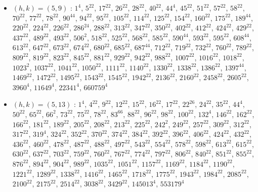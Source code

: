 \begin{itemize}
\item $(h,k)=(5,9)$ : $1^{4}$, $5^{22}$, $17^{22}$, $26^{22}$, $28^{22}$, $40^{22}$, $44^{4}$, $45^{22}$, $51^{22}$, $57^{22}$, $58^{22}$, $70^{22}$, $77^{22}$, $78^{22}$, $90^{44}$, $94^{22}$, $95^{22}$, $105^{22}$, $114^{22}$, $125^{22}$, $154^{22}$, $160^{22}$, $175^{22}$, $189^{44}$, $220^{22}$, $224^{22}$, $226^{22}$, $286^{24}$, $288^{22}$, $313^{22}$, $347^{22}$, $350^{22}$, $402^{22}$, $412^{22}$, $424^{22}$, $429^{22}$, $437^{22}$, $489^{22}$, $493^{22}$, $506^{2}$, $518^{22}$, $525^{22}$, $568^{22}$, $585^{22}$, $590^{44}$, $593^{22}$, $595^{22}$, $608^{44}$, $613^{22}$, $647^{22}$, $673^{22}$, $674^{22}$, $680^{22}$, $685^{22}$, $687^{44}$, $712^{22}$, $719^{22}$, $732^{22}$, $760^{22}$, $789^{22}$, $809^{22}$, $819^{22}$, $823^{22}$, $845^{22}$, $881^{22}$, $929^{22}$, $942^{22}$, $988^{22}$, $1007^{22}$, $1016^{22}$, $1018^{22}$, $1023^{2}$, $1037^{22}$, $1041^{22}$, $1050^{22}$, $1111^{22}$, $1140^{22}$, $1330^{22}$, $1338^{22}$, $1386^{22}$, $1397^{44}$, $1469^{22}$, $1472^{22}$, $1495^{22}$, $1543^{22}$, $1545^{22}$, $1942^{22}$, $2136^{22}$, $2160^{22}$, $2458^{22}$, $2605^{22}$, $3960^{4}$, $11649^{4}$, $22341^{4}$, $660759^{4}$
\item $(h,k)=(5,13)$ : $1^{4}$, $4^{22}$, $9^{22}$, $12^{22}$, $15^{22}$, $16^{22}$, $17^{22}$, $22^{26}$, $24^{22}$, $35^{22}$, $44^{4}$, $50^{22}$, $65^{22}$, $66^{2}$, $73^{22}$, $75^{22}$, $78^{22}$, $83^{66}$, $88^{22}$, $96^{22}$, $98^{22}$, $100^{22}$, $132^{4}$, $146^{22}$, $162^{22}$, $166^{22}$, $181^{22}$, $189^{22}$, $205^{22}$, $208^{22}$, $213^{22}$, $225^{22}$, $242^{2}$, $249^{22}$, $257^{22}$, $309^{22}$, $312^{22}$, $317^{22}$, $319^{4}$, $324^{22}$, $352^{22}$, $370^{22}$, $374^{22}$, $384^{22}$, $392^{22}$, $396^{22}$, $406^{22}$, $424^{22}$, $432^{22}$, $436^{22}$, $460^{22}$, $478^{22}$, $487^{22}$, $488^{22}$, $497^{22}$, $543^{22}$, $554^{22}$, $578^{22}$, $598^{22}$, $613^{22}$, $615^{22}$, $630^{22}$, $637^{22}$, $703^{22}$, $759^{22}$, $760^{22}$, $767^{22}$, $774^{22}$, $797^{22}$, $806^{22}$, $840^{22}$, $851^{22}$, $855^{22}$, $876^{22}$, $894^{22}$, $904^{22}$, $989^{22}$, $1035^{22}$, $1051^{22}$, $1157^{22}$, $1169^{22}$, $1184^{22}$, $1190^{22}$, $1221^{22}$, $1289^{22}$, $1338^{22}$, $1416^{22}$, $1465^{22}$, $1718^{22}$, $1775^{22}$, $1943^{22}$, $1984^{22}$, $2085^{22}$, $2100^{22}$, $2175^{22}$, $2514^{22}$, $3038^{22}$, $3429^{22}$, $145013^{4}$, $553179^{4}$

\end{itemize}
